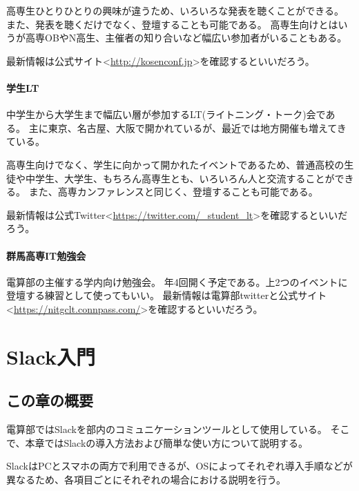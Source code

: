 \documentclass[lualatex,ja=standard,12pt,a4j]{bxjsbook}
\begin{document}
					高専生ひとりひとりの興味が違うため、いろいろな発表を聴くことができる。
					また、発表を聴くだけでなく、登壇することも可能である。
					高専生向けとはいうが高専OBやN高生、主催者の知り合いなど幅広い参加者がいることもある。
					
					最新情報は公式サイト<\url{http://kosenconf.jp}>を確認するといいだろう。
				\subsubsection{学生LT}
					中学生から大学生まで幅広い層が参加するLT(ライトニング・トーク)会である。
					主に東京、名古屋、大阪で開かれているが、最近では地方開催も増えてきている。
					
					高専生向けでなく、学生に向かって開かれたイベントであるため、普通高校の生徒や中学生、大学生、もちろん高専生とも、いろいろん人と交流することができる。
					また、高専カンファレンスと同じく、登壇することも可能である。
					
					最新情報は公式Twitter<\url{https://twitter.com/_student_lt}>を確認するといいだろう。
				\subsubsection{群馬高専IT勉強会}
					電算部の主催する学内向け勉強会。
					年4回開く予定である。上2つのイベントに登壇する練習として使ってもいい。
					最新情報は電算部twitterと公式サイト<\url{https://nitgclt.connpass.com/}>を確認するといいだろう。
	\chapter{Slack入門}
		\section{この章の概要}
			電算部ではSlackを部内のコミュニケーションツールとして使用している。
            そこで、本章ではSlackの導入方法および簡単な使い方について説明する。
            
            SlackはPCとスマホの両方で利用できるが、OSによってそれぞれ導入手順などが異なるため、各項目ごとにそれぞれの場合における説明を行う。
\end{document}
